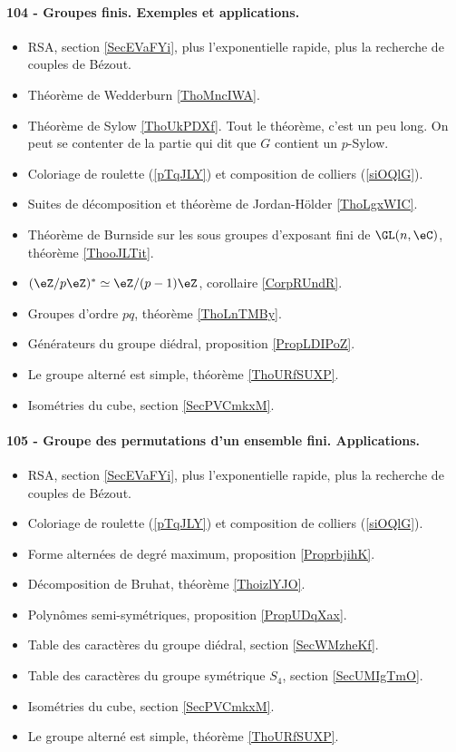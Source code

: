 \paragraph{104 - Groupes finis. Exemples et applications.}
\begin{itemize}
    \item RSA, section \ref{SecEVaFYi}, plus l'exponentielle rapide, plus la recherche de couples de Bézout.
    \item Théorème de Wedderburn \ref{ThoMncIWA}.
    \item Théorème de Sylow \ref{ThoUkPDXf}. Tout le théorème, c'est un peu long. On peut se contenter de la partie qui dit que \( G\) contient un \( p\)-Sylow.
    \item Coloriage de roulette (\ref{pTqJLY}) et composition de colliers (\ref{siOQlG}).
    \item Suites de décomposition et théorème de Jordan-Hölder \ref{ThoLgxWIC}.
    \item Théorème de Burnside sur les sous groupes d'exposant fini de \( \GL(n,\eC)\), théorème \ref{ThooJLTit}.
    \item \( (\eZ/p\eZ)^*\simeq \eZ/(p-1)\eZ\), corollaire \ref{CorpRUndR}.
    \item Groupes d'ordre \( pq\), théorème \ref{ThoLnTMBy}.
    \item Générateurs du groupe diédral, proposition \ref{PropLDIPoZ}.
    \item Le groupe alterné est simple, théorème \ref{ThoURfSUXP}.
    \item Isométries du cube, section \ref{SecPVCmkxM}.
\end{itemize}
\paragraph{105 - Groupe des permutations d’un ensemble fini. Applications.}
\begin{itemize}
    \item RSA, section \ref{SecEVaFYi}, plus l'exponentielle rapide, plus la recherche de couples de Bézout.
    \item Coloriage de roulette (\ref{pTqJLY}) et composition de colliers (\ref{siOQlG}).
    \item Forme alternées de degré maximum, proposition \ref{ProprbjihK}.
    \item Décomposition de Bruhat, théorème \ref{ThoizlYJO}.
    \item Polynômes semi-symétriques, proposition \ref{PropUDqXax}.
    \item Table des caractères du groupe diédral, section \ref{SecWMzheKf}.
    \item Table des caractères du groupe symétrique \( S_4\), section \ref{SecUMIgTmO}.
    \item Isométries du cube, section \ref{SecPVCmkxM}.
    \item Le groupe alterné est simple, théorème \ref{ThoURfSUXP}.
\end{itemize}
